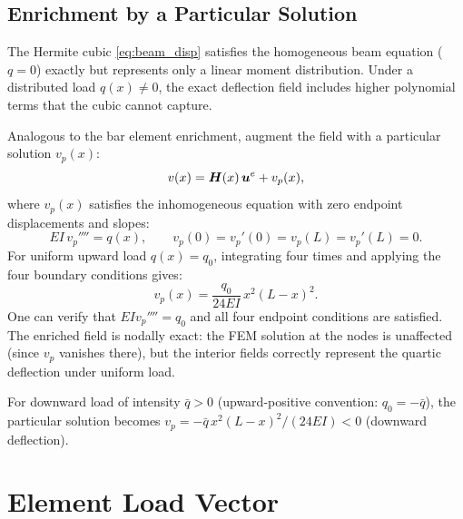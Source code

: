 \subsection{Enrichment by a Particular Solution}

The Hermite cubic \cref{eq:beam_disp} satisfies the homogeneous beam equation
($q = 0$) exactly but represents only a linear moment distribution. Under
a distributed load $q(x) \neq 0$, the exact deflection field includes higher
polynomial terms that the cubic cannot capture.

Analogous to the bar element enrichment, augment the field with a particular
solution $v_p(x)$:
\begin{equation}
    v(x) = \bm{H}(x)\,\bm{u}^e + v_p(x) ,
    \label{eq:beam_disp_enriched}
\end{equation}
where $v_p(x)$ satisfies the inhomogeneous equation with zero endpoint
displacements and slopes:
\begin{equation}
    EI\,v_p'''' = q(x), \qquad
    v_p(0) = v_p'(0) = v_p(L) = v_p'(L) = 0 .
    \label{eq:beam_vp_bvp}
\end{equation}
For uniform upward load $q(x) = q_0$, integrating four times and applying the
four boundary conditions gives:
\begin{equation}
    v_p(x) = \frac{q_0}{24EI}\,x^2(L - x)^2 .
    \label{eq:beam_vp}
\end{equation}
One can verify that $EI v_p'''' = q_0$ and all four endpoint conditions are
satisfied. The enriched field is nodally exact: the FEM solution at the nodes
is unaffected (since $v_p$ vanishes there), but the interior fields correctly
represent the quartic deflection under uniform load.

\begin{remark}
For downward load of intensity $\bar{q} > 0$ (upward-positive convention:
$q_0 = -\bar{q}$), the particular solution becomes
$v_p = -\bar{q}\,x^2(L-x)^2 / (24EI) < 0$ (downward deflection).
\end{remark}

\section{Element Load Vector}

